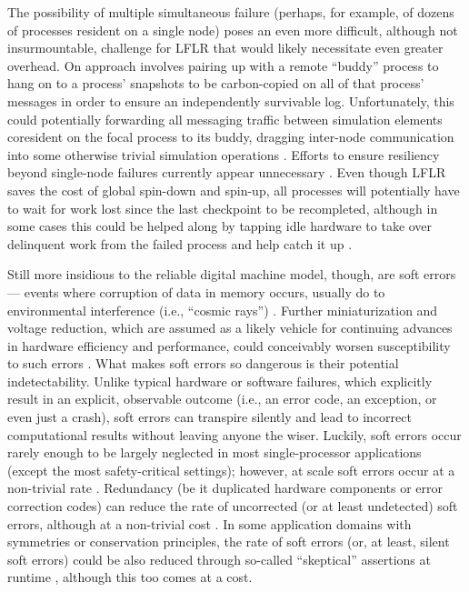 The possibility of multiple simultaneous failure (perhaps, for example, of dozens of processes resident on a single node) poses an even more difficult, although not insurmountable, challenge for LFLR that would likely necessitate even greater overhead.
On approach involves pairing up with a remote ``buddy'' process to hang on to a process' snapshots to be carbon-copied on all of that process' messages in order to ensure an independently survivable log.
Unfortunately, this could potentially forwarding all messaging traffic between simulation elements coresident on the focal process to its buddy, dragging inter-node communication into some otherwise trivial simulation operations \citep{chakravorty2007fault}.
Efforts to ensure resiliency beyond single-node failures currently appear unnecessary \citep[p. 12]{ni2016mitigation}.
Even though LFLR saves the cost of global spin-down and spin-up, all processes will potentially have to wait for work lost since the last checkpoint to be recompleted, although in some cases this could be helped along by tapping idle hardware to take over delinquent work from the failed process and help catch it up \citep{dongarra2014applied}.

Still more insidious to the reliable digital machine model, though, are soft errors --- events where corruption of data in memory occurs, usually do to environmental interference (i.e., ``cosmic rays'') \citep{karnik2004characterization}.
Further miniaturization and voltage reduction, which are assumed as a likely vehicle for continuing advances in hardware efficiency and performance, could conceivably  worsen susceptibility to such errors \citep{dongarra2014applied,kajmakovic2020challenges}.
What makes soft errors so dangerous is their potential indetectability.
Unlike typical hardware or software failures, which explicitly result in an explicit, observable outcome (i.e., an error code, an exception, or even just a crash), soft errors can transpire silently and lead to incorrect computational results without leaving anyone the wiser.
Luckily, soft errors occur rarely enough to be largely neglected in most single-processor applications (except the most safety-critical settings); however, at scale soft errors occur at a non-trivial rate
\citep{sridharan2015memory,scoles2018cosmic}.
Redundancy (be it duplicated hardware components or error correction codes) can reduce the rate of uncorrected (or at least undetected) soft errors, although at a non-trivial cost \citep{vankeirsbilck2015soft,sridharan2015memory}.
In some application domains with symmetries or conservation principles, the rate of soft errors (or, at least, silent soft errors) could be also reduced through so-called ``skeptical'' assertions at runtime \citep{dongarra2014applied}, although this too comes at a cost.


